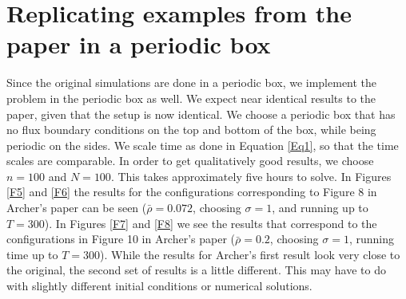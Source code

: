 \documentclass[11pt, a4paper]{article}
\theoremstyle{definition}
\begin{document}
	\section{Replicating examples from the paper in a periodic box}
	Since the original simulations are done in a periodic box, we implement the problem in the periodic box as well. We expect near identical results to the paper, given that the setup is now identical.
	We choose a periodic box that has no flux boundary conditions on the top and bottom of the box, while being periodic on the sides. 
	We scale time as done in Equation \eqref{Eq1}, so that the time scales are comparable. In order to get qualitatively good results, we choose $n =100$ and $N = 100$. This takes approximately five hours to solve. In Figures \ref{F5} and \ref{F6} the results for the configurations corresponding to Figure 8 in Archer's paper can be seen ($ \bar \rho = 0.072$, choosing $\sigma = 1$, and running up to $T = 300$). In Figures \ref{F7} and \ref{F8} we see the results that correspond to the configurations in Figure 10 in Archer's paper ($ \bar \rho = 0.2$, choosing $\sigma = 1$, running time up to $T = 300$). While the results for Archer's first result look very close to the original, the second set of results is a little different. This may have to do with slightly different initial conditions or numerical solutions.
	
\end{document}
